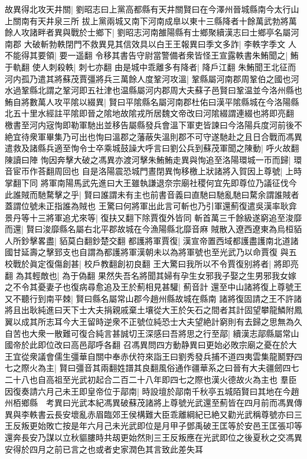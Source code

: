 故異得北攻天井關|{
	劉昭志曰上黨高都縣有天井關賢曰在今澤州晉城縣南今太行山上關南有天井泉三所}
拔上黨兩城又南下河南成臯以東十三縣降者十餘萬武勃將萬餘人攻諸畔者異與戰於士鄉下|{
	劉昭志河南雒陽縣有士鄉聚續漢志曰士鄉亭名屬河南郡}
大破斬勃軼閉門不救異見其信效具以白王王報異曰季文多詐|{
	李軼字季文}
人不能得其要領|{
	要一遥翻}
令移其書告守尉當警備者衆皆怪王宣露軼書朱鮪聞之|{
	鮪于軌翻}
使人刺殺軼|{
	刺七亦翻}
由是城中乖離多有降者|{
	降戶江翻}
朱鮪聞王北征而河内孤乃遣其將蘇茂賈彊將兵三萬餘人度鞏河攻溫|{
	鞏縣屬河南郡周鞏伯之國也河水過鞏縣北謂之鞏河即五社津也温縣屬河内郡周大夫蘇子邑賢曰鞏温並今洛州縣也}
鮪自將數萬人攻平隂以綴異|{
	賢曰平隂縣名屬河南郡杜佑曰漢平隂縣城在今洛陽縣北五十里水經註平隂即晉之隂地故隂戎所居魏文帝改曰河隂綴謂連綴也將即亮翻}
檄書至河内宼恂即勒軍馳出並移告屬縣發兵會溫下軍吏皆諫曰今洛陽兵度河前後不絶宜待衆軍畢集乃可出也恂曰溫郡之藩蔽失溫則郡不可守遂馳赴之且日合戰而馮異遣救及諸縣兵適至恂令士卒乘城鼓譟大呼言曰劉公兵到蘇茂軍聞之陳動|{
	呼火故翻陳讀曰陣}
恂因奔擊大破之馮異亦渡河擊朱鮪鮪走異與恂追至洛陽環城一帀而歸|{
	環音宦帀作荅翻周回也}
自是洛陽震恐城門晝閉異恂移檄上狀諸將入賀因上尊號|{
	上時掌翻下同}
將軍南陽馬武先進曰大王雖執謙退奈宗廟社稷何宜先即尊位乃議征伐今此誰賊而馳騖擊之乎|{
	賢曰誰謂未有主也前書音義曰直馳曰馳亂馳曰騖余謂誰賊者蓋謂位號未正指誰為賊也}
王驚曰何將軍出此言可斬也乃引軍還薊復遣吳漢率耿弇景丹等十三將軍追尤來等|{
	復扶又翻下除賈復外皆同}
斬首萬三千餘級遂窮追至浚靡而還|{
	賢曰浚靡縣名屬右北平郡故城在今漁陽縣北靡音麻}
賊散入遼西遼東為烏桓貊人所鈔擊畧盡|{
	貊莫白翻鈔楚交翻}
都護將軍賈復|{
	漢宣帝置西域都護盡護南北道諸國甘延壽之擊郅支也自謂為都護將軍漢朝未以為將軍號也至光武乃以命賈復}
與五校戰於眞定復傷創甚|{
	校戶教翻創初良翻}
王大驚曰我所以不令賈復别將者|{
	將即亮翻}
為其輕敵也|{
	為于偽翻}
果然失吾名將聞其婦有孕生女邪我子娶之生男邪我女嫁之不令其憂妻子也復病尋愈追及王於薊相見甚驩|{
	薊音計}
還至中山諸將復上尊號王又不聽行到南平棘|{
	賢曰縣名屬常山郡今趙州縣故城在縣南}
諸將復固請之王不許諸將且出耿純進曰天下士大夫捐親戚棄土壤從大王於矢石之間者其計固望攀龍鱗附鳳翼以成其所志耳今大王留時逆衆不正號位純恐士大夫望絶計窮則有去歸之思無為久自苦也大衆一散難可復合純言甚誠切王深感曰吾將思之行至鄗|{
	續漢志鄗縣屬常山國帝於此即位改曰高邑鄗呼各翻}
召馮異問四方動静異曰更始必敗宗廟之憂在於大王宜從衆議會儒生彊華自關中奉赤伏符來詣王曰劉秀發兵捕不道四夷雲集龍鬭野四七之際火為主|{
	賢曰彊音其兩翻姓譜其良翻風俗通作疆華系之曰晉有大夫疆劒四七二十八也自高祖至光武初起合二百二十八年即四七之際也漢火德故火為主也}
羣臣因復奏請六月己未王即皇帝位于鄗南|{
	時設壇於鄗南千秋亭五城陌賢曰其地在今趙州栢鄉縣　考異曰光武本紀馮異破蘇茂諸將上尊號光武還至薊皆在四月前而馮異傳異與李軼書云長安壞亂赤眉臨郊王侯構難大臣乖離綱紀已絶又勸光武稱尊號亦曰三王反叛更始敗亡按是年六月己未光武即位是月甲子鄧禹破王匡等於安邑王匡張卭等還奔長安乃謀以立秋貙膢時共刼更始然則三王反叛應在光武即位之後夏秋之交馮異安得於四月之前已言之也或者史家潤色其言致此差失耳}
